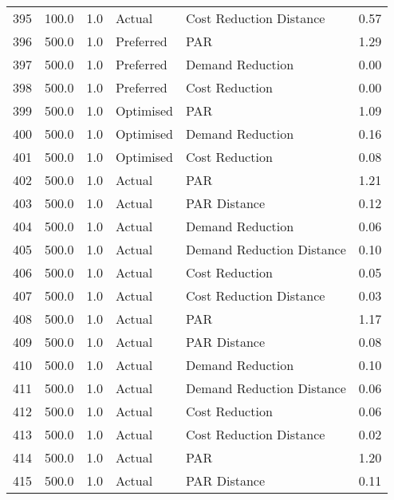 \begin{longtable}{lrrllr}
395  &        100.0 &     1.0 &         Actual &    Cost Reduction Distance &   0.57 \\
396  &        500.0 &     1.0 &      Preferred &                        PAR &   1.29 \\
397  &        500.0 &     1.0 &      Preferred &           Demand Reduction &   0.00 \\
398  &        500.0 &     1.0 &      Preferred &             Cost Reduction &   0.00 \\
399  &        500.0 &     1.0 &      Optimised &                        PAR &   1.09 \\
400  &        500.0 &     1.0 &      Optimised &           Demand Reduction &   0.16 \\
401  &        500.0 &     1.0 &      Optimised &             Cost Reduction &   0.08 \\
402  &        500.0 &     1.0 &         Actual &                        PAR &   1.21 \\
403  &        500.0 &     1.0 &         Actual &               PAR Distance &   0.12 \\
404  &        500.0 &     1.0 &         Actual &           Demand Reduction &   0.06 \\
405  &        500.0 &     1.0 &         Actual &  Demand Reduction Distance &   0.10 \\
406  &        500.0 &     1.0 &         Actual &             Cost Reduction &   0.05 \\
407  &        500.0 &     1.0 &         Actual &    Cost Reduction Distance &   0.03 \\
408  &        500.0 &     1.0 &         Actual &                        PAR &   1.17 \\
409  &        500.0 &     1.0 &         Actual &               PAR Distance &   0.08 \\
410  &        500.0 &     1.0 &         Actual &           Demand Reduction &   0.10 \\
411  &        500.0 &     1.0 &         Actual &  Demand Reduction Distance &   0.06 \\
412  &        500.0 &     1.0 &         Actual &             Cost Reduction &   0.06 \\
413  &        500.0 &     1.0 &         Actual &    Cost Reduction Distance &   0.02 \\
414  &        500.0 &     1.0 &         Actual &                        PAR &   1.20 \\
415  &        500.0 &     1.0 &         Actual &               PAR Distance &   0.11 \\

\end{longtable}

